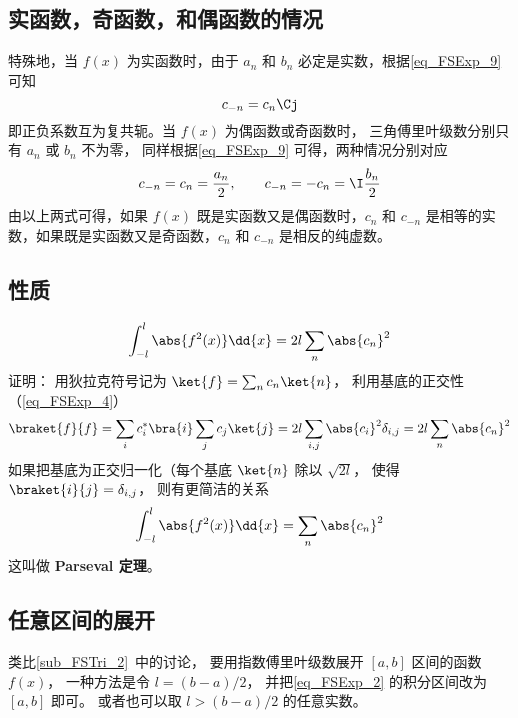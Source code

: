 \subsection{实函数，奇函数，和偶函数的情况}
特殊地，当 $f(x)$ 为实函数时，由于 $a_n$ 和 $b_n$ 必定是实数，根据\autoref{eq_FSExp_9} 可知
\begin{equation}
c_{-n} = c_{n}\Cj
\end{equation}
即正负系数互为复共轭。当 $f(x)$ 为偶函数或奇函数时， 三角傅里叶级数分别只有 $a_n$ 或 $b_n$ 不为零， 同样根据\autoref{eq_FSExp_9} 可得，两种情况分别对应
\begin{equation}
c_{-n} = c_n =\frac{a_n}{2}, \qquad
c_{-n} = -c_n = \I \frac{b_n}{2}
\end{equation}
由以上两式可得，如果 $f(x)$ 既是实函数又是偶函数时，$c_n$ 和 $c_{-n}$ 是相等的实数，如果既是实函数又是奇函数，$c_n$ 和 $c_{-n}$ 是相反的纯虚数。

\subsection{性质}
\begin{equation}
\int_{-l}^l \abs{f^2(x)} \dd{x} =  2l\sum_n \abs{c_n}^2
\end{equation}
证明： 用狄拉克符号记为 $\ket{f} = \sum_n c_n \ket{n}$， 利用基底的正交性（\autoref{eq_FSExp_4}）
\begin{equation}
\braket{f}{f} = \sum_i c_i^* \bra{i} \sum_j c_j \ket{j} = 2l \sum_{i,j} \abs{c_i}^2 \delta_{i,j} = 2l \sum_n \abs{c_n}^2
\end{equation}
如果把基底为正交归一化（每个基底 $\ket{n}$ 除以 $\sqrt{2l}$， 使得 $\braket{i}{j} = \delta_{i,j}$， 则有更简洁的关系
\begin{equation}\label{eq_FSExp_5}
\int_{-l}^l \abs{f^2(x)} \dd{x} =  \sum_n \abs{c_n}^2
\end{equation}
这叫做 \textbf{Parseval 定理}。

\subsection{任意区间的展开}
类比\autoref{sub_FSTri_2}~中的讨论， 要用指数傅里叶级数展开 $[a, b]$ 区间的函数 $f(x)$， 一种方法是令 $l = (b - a)/2$， 并把\autoref{eq_FSExp_2} 的积分区间改为 $[a, b]$ 即可。 或者也可以取 $l > (b - a)/2$ 的任意实数。
